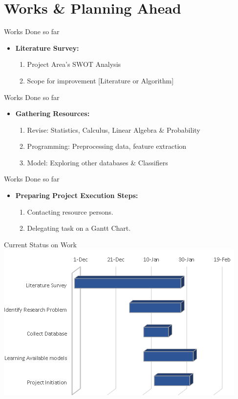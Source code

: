 \documentclass{beamer}
\begin{document}
\section{Works \& Planning Ahead}
\begin{frame}{Works Done so far}
\begin{itemize}
    \item \textbf{Literature Survey:}
    \begin{enumerate}
        \item Project Area's SWOT Analysis
        \item Scope for improvement [Literature or Algorithm]
    \end{enumerate}
\end{itemize}
    
\end{frame}
\begin{frame}{Works Done so far}
\begin{itemize}
    \item \textbf{Gathering Resources:}
    \begin{enumerate}
        \item Revise: Statistics, Calculus, Linear Algebra \& Probability
        \item Programming: Preprocessing data, feature extraction
        \item Model: Exploring other databases \& Classifiers 
    \end{enumerate}
\end{itemize}
    
\end{frame}
\begin{frame}{Works Done so far}
\begin{itemize}
    \item \textbf{Preparing Project Execution Steps:}
    \begin{enumerate}
        \item Contacting resource persons.
        \item Delegating task on a Gantt Chart.
    \end{enumerate}
\end{itemize}

\end{frame}
\begin{frame}{Current Status on Work}
\centering
    \includegraphics[width=\textwidth]{current status.PNG}
\end{frame}
\end{document}
